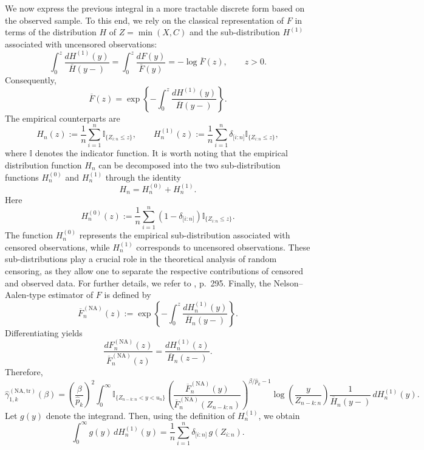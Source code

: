 \documentclass[reqno,openbib,runningheads,a4paper,12pt]{amsart}%
\begin{document}
\noindent We now express the previous integral in a more tractable discrete
form based on the observed sample. To this end, we rely on the classical
representation of $F$ in terms of the distribution $H$ of $Z=\min(X,C)$ and
the sub-distribution $H^{(1)}$ associated with uncensored observations:
\[
\int_{0}^{z}\frac{dH^{(1)}(y)}{\overline{H}(y-)}=\int_{0}^{z}\frac
{dF(y)}{\overline{F}(y)}=-\log\overline{F}(z),\qquad z>0.
\]
Consequently,
\[
\overline{F}(z)=\exp\left\{  -\int_{0}^{z}\frac{dH^{(1)}(y)}{\overline{H}%
(y-)}\right\}  .
\]
The empirical counterparts are
\[
H_{n}(z):=\frac{1}{n}\sum_{i=1}^{n}\mathbb{I}_{\{Z_{i:n}\leq z\}},\qquad
H_{n}^{(1)}(z):=\frac{1}{n}\sum_{i=1}^{n}\delta_{\lbrack i:n]}\mathbb{I}%
_{\{Z_{i:n}\leq z\}},
\]
where $\mathbb{I}$ denotes the indicator function. It is worth noting that the
empirical distribution function $H_{n}$ can be decomposed into the two
sub-distribution functions $H_{n}^{(0)}$ and $H_{n}^{(1)}$ through the
identity
\[
H_{n}=H_{n}^{(0)}+H_{n}^{(1)}.
\]
Here
\[
H_{n}^{(0)}(z):=\frac{1}{n}\sum_{i=1}^{n}\left(  1-\delta_{\lbrack
i:n]}\right)  \mathbb{I}_{\{Z_{i:n}\leq z\}}.
\]
The function $H_{n}^{(0)}$ represents the empirical sub-distribution
associated with censored observations, while $H_{n}^{(1)}$ corresponds to
uncensored observations. These sub-distributions play a crucial role in the
theoretical analysis of random censoring, as they allow one to separate the
respective contributions of censored and observed data. For further details,
we refer to \cite{SW86}, p.~295. Finally, the Nelson--Aalen-type estimator of
$F$ is defined by
\begin{equation}
\overline{F}_{n}^{(\mathrm{NA})}(z):=\exp\left\{  -\int_{0}^{z}\frac
{dH_{n}^{(1)}(y)}{\overline{H}_{n}(y-)}\right\}  . \label{emp-F-formula-adapt}%
\end{equation}
\noindent Differentiating yields
\[
\frac{dF_{n}^{(\mathrm{NA})}(z)}{\overline{F}_{n}^{(\mathrm{NA})}(z)}%
=\frac{dH_{n}^{(1)}(z)}{\overline{H}_{n}(z-)}.
\]
Therefore,
\[
\widehat{\gamma}_{1,k}^{(\mathrm{NA,tr})}(\beta)=\left(  \frac{\beta
}{\widehat{p}_{k}}\right)  ^{2}\int_{0}^{\infty}\mathbb{I}_{\{Z_{n-k:n}%
<y<u_{n}\}}\left(  \frac{\overline{F}_{n}^{(\mathrm{NA})}(y)}{\overline{F}%
_{n}^{(\mathrm{NA})}(Z_{n-k:n})}\right)  ^{\beta/\widehat{p}_{k}-1}%
\log\!\left(  \frac{y}{Z_{n-k:n}}\right)  \frac{1}{\overline{H}_{n}%
(y-)}\,dH_{n}^{(1)}(y).
\]
Let $g(y)$ denote the integrand. Then, using the definition of $H_{n}^{(1)}$,
we obtain
\[
\int_{0}^{\infty}g(y)\,dH_{n}^{(1)}(y)=\frac{1}{n}\sum_{i=1}^{n}%
\delta_{\lbrack i:n]}\,g(Z_{i:n}).
\]
\end{document}
